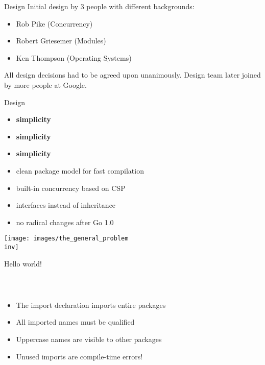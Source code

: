 \documentclass[10pt]{beamer}
\newcommand{\inv}{-inv}
\begin{document}
	\begin{frame}{Design}
		Initial design by 3 people with different backgrounds:
		\begin{itemize}
			\item Rob Pike (Concurrency)
			\item Robert Griesemer (Modules)
			\item Ken Thompson (Operating Systems)
		\end{itemize}
		All design decisions had to be agreed upon unanimously.
		Design team later joined by more people at Google.
	\end{frame}
	
	
	\begin{frame}{Design}
		\begin{itemize}
			\item \textbf{simplicity}
			\item \textbf{simplicity}
			\item \textbf{simplicity}
			\item clean package model for fast compilation
			\item built-in concurrency based on CSP
			\item interfaces instead of inheritance
			\item no radical changes after Go 1.0
		\end{itemize}
	\end{frame}
	
	
	\begin{frame}
		\begin{center}
			\texttt{[image: images/the\_general\_problem\\inv]}
		\end{center}
	\end{frame}
	
	
	\begin{frame}[fragile]{Hello world!}
		\inputminted{go}{code/01_hello.go}
		\\
		\begin{itemize}
			\item The import declaration imports entire packages
			\item All imported names must be qualified
			\item Uppercase names are visible to other packages
			\item Unused imports are compile-time errors!
		\end{itemize}
\end{frame}
	
\end{document}
